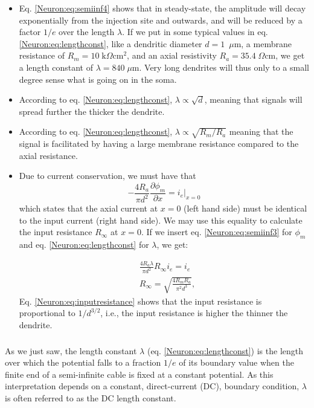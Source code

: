 \begin{itemize}

\item Eq. \ref{Neuron:eq:semiinf4} shows that in steady-state, the amplitude will decay exponentially from the injection site and outwards, and will be reduced by a factor $1/e$ over the length $\lambda$. If we put in some typical values in eq. \ref{Neuron:eq:lengthconst}, like a dendritic diameter $d=1$~$\mu$m, a membrane resistance of $R_m=10\;\text{k}\Omega\text{cm}^2$, and an axial resistivity $R_a=35.4\;\Omega\text{cm}$, we get a length constant of $\lambda = 840\; \mu$m. Very long dendrites will thus only to a small degree sense what is going on in the soma.

\item According to eq. \ref{Neuron:eq:lengthconst}, $\lambda \propto \sqrt{d}$, meaning that signals will spread further the thicker the dendrite.

\item According to eq. \ref{Neuron:eq:lengthconst}, $\lambda \propto \sqrt{R_m/R_a}$ meaning that the signal is facilitated by having a large membrane resistance compared to the axial resistance.

\item Due to current conservation, we must have that
\begin{equation}
- \frac{4R_a}{\pi d^2} \frac{\partial \phi_m}{\partial x}  = i_e  \Big|_{x=0}
\end{equation}
which states that the axial current at $x=0$ (left hand side) must be identical to the input current (right hand side). We may use this equality to calculate the input resistance $R_{\infty}$ at $x=0$. If we insert eq. \ref{Neuron:eq:semiinf3} for $\phi_m$ and eq. \ref{Neuron:eq:lengthconst} for $\lambda$, we get:

\begin{align}
&\frac{4R_a \lambda}{\pi d^2} R_{\infty} i_e  = i_e \\
&R_{\infty} =  \sqrt{\frac{4R_m R_a}{\pi^2 d^3}}, 
\label{Neuron:eq:inputresistance}
\end{align}
Eq. \ref{Neuron:eq:inputresistance} shows that the input resistance is proportional to $1/d^{3/2}$, i.e., the input resistance is higher the thinner the dendrite. 
\end{itemize}



\subsubsection{}
\label{sec:Neuron:cablefreq}
As we just saw, the length constant $\lambda$ (eq. \ref{Neuron:eq:lengthconst}) is the length over which the potential falls to a fraction $1/e$ of its boundary value when the finite end of a semi-infinite cable is fixed at a constant potential. As this interpretation depends on a constant, direct-current (DC), boundary condition, $\lambda$ is often referred to as the DC length constant. 

